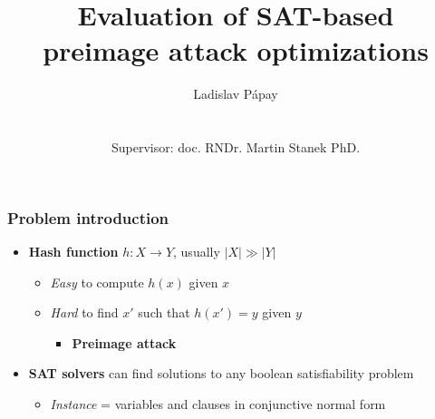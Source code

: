 \documentclass{beamer}
\title[SAT-based preimage attack optimizations]{Evaluation of SAT-based\\ preimage attack optimizations}
\author[Ladislav Pápay]{Ladislav Pápay\\~\\~\\ Supervisor: doc. RNDr. Martin Stanek PhD.}
\date{}
\let\olditem\item
\renewcommand{\item}{%
\olditem\vspace{4pt}}
\begin{document}
\frame{\titlepage}

%
%
%

\begin{frame}
\frametitle{Problem introduction}
\begin{itemize}
\item \textbf{Hash function} $h: X \to Y$, usually $|X| \gg |Y|$
\begin{itemize}
	\item \emph{Easy} to compute $h(x)$ given $x$
	\item \emph{Hard} to find $x'$ such that $h(x') = y$ given $y$
	\begin{itemize}
		\item \textbf{Preimage attack}
	\end{itemize}
\end{itemize}
\item \textbf{SAT solvers} can find solutions to any boolean satisfiability problem
\begin{itemize}
	\item \emph{Instance} = variables and clauses in conjunctive normal form
\end{itemize}
\end{itemize}
\end{frame}
\end{document}
